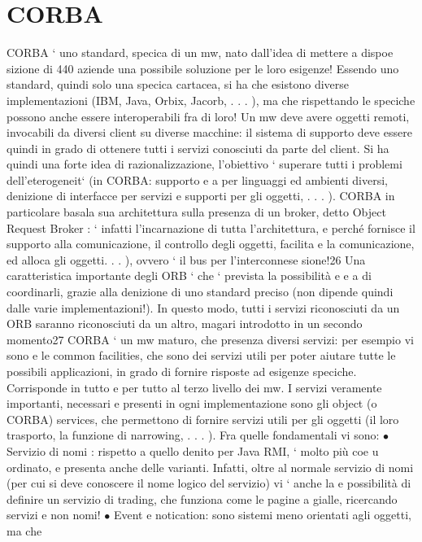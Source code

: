 \documentclass[a4paper,12pt]{article}
\begin{document}
\section{CORBA}
CORBA ` uno standard, specica di un mw, nato dall'idea di mettere a dispoe
sizione di 440 aziende una possibile soluzione per le loro esigenze!
Essendo uno standard, quindi solo una specica cartacea, si ha che esistono
diverse implementazioni (IBM, Java, Orbix, Jacorb, . . . ), ma che rispettando le
speciche possono anche essere interoperabili fra di loro!
Un mw deve avere oggetti remoti, invocabili da diversi client su diverse macchine: il sistema di supporto deve essere
quindi in grado di ottenere tutti i servizi
conosciuti da parte del client. Si ha quindi una forte idea di razionalizzazione,
l'obiettivo ` superare tutti i problemi dell'eterogeneit` (in CORBA: supporto
e
a
per linguaggi ed ambienti diversi, denizione di interfacce per servizi e supporti
per gli oggetti, . . . ).
CORBA in particolare basala sua architettura sulla presenza di un broker,
detto Object Request Broker : ` infatti l'incarnazione di tutta l'architettura,
e
perché fornisce il supporto alla comunicazione, il controllo degli oggetti, facilita
e
la comunicazione, ed alloca gli oggetti. . . ), ovvero ` il bus per l'interconnese
sione!26 Una caratteristica importante degli ORB ` che ` prevista la possibilità
e
e
a
di coordinarli, grazie alla denizione di uno standard preciso (non dipende quindi dalle varie implementazioni!). In
questo modo, tutti i servizi riconosciuti da
un ORB saranno riconosciuti da un altro, magari introdotto in un secondo
momento27
CORBA ` un mw maturo, che presenza diversi servizi: per esempio vi sono
e
le common facilities, che sono dei servizi utili per poter aiutare tutte le possibili
applicazioni, in grado di fornire risposte ad esigenze speciche. Corrisponde in
tutto e per tutto al terzo livello dei mw.
I servizi veramente importanti, necessari e presenti in ogni implementazione
sono gli object (o CORBA) services, che permettono di fornire servizi utili per gli
oggetti (il loro trasporto, la funzione di narrowing, . . . ). Fra quelle fondamentali
vi sono:
$\bullet$ Servizio di nomi : rispetto a quello denito per Java RMI, ` molto più coe
u
ordinato, e presenta anche delle varianti. Infatti, oltre al normale servizio
di nomi (per cui si deve conoscere il nome logico del servizio) vi ` anche la
e
possibilità di definire un servizio di trading, che funziona come le pagine
a
gialle, ricercando servizi e non nomi!
$\bullet$ Event e notication: sono sistemi meno orientati agli oggetti, ma che
\end{document}

